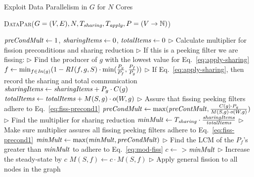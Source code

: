 \begin{algorithm}[t]
\caption{Exploit Data Parallelism in $G$ for $N$
  Cores} \label {alg:data-parallelize}
\footnotesize
\textsc{DataPar}($G=(V, E), N, T_{\relax{\it sharing}},
T_{\relax{\it apply}}, P=(V \rightarrow \mathbb{N}) $)
\begin{algorithmic}[1]
\State $\relax{\it preCondMult} \gets 1$, $\relax{\it sharingItems} \gets 0$, $\relax{\it totalItems} \gets 0$
\State $\triangleright$ Calculate multiplier for fission preconditions and sharing reduction
\State $\triangleright$ If this is a peeking filter we are fissing:
\State $\triangleright$ Find the producer of $g$ with the lowest
value for Eq.~\ref{eq:apply-sharing}
\State $f \gets \min_{f \in \relax{\it In}(g)} (1 -\relax{\it RI}(f,g, S) \cdot
\min(\frac{P_g}{P_f},\frac{P_f}{P_g} )) $
\label{ln:dp1}
\State $\triangleright$ If Eq.~\ref{eq:apply-sharing},
then record the sharing and total communication
\State $\relax{\it sharingItems} \gets \relax{\it sharingItems} + P_g \cdot C(g)$
\State $\relax{\it totalItems} \gets \relax{\it totalItems} + M(S,g) \cdot o(W, g)$
\EndIf 
\State $\triangleright$ Assure that fissing peeking filters adhere to Eq.~\ref{eq:fiss-precond1}
\State $\relax{\it preCondMult} \gets \max(\relax{\it preContMult}, \frac{C(g) \cdot P_g}{M(S,g)
 \cdot o(W,g)})$  
\label{ln:dp3}
\EndIf
\EndFor
\State $\triangleright$ Find the multiplier for sharing reduction
\State $\relax{\it minMult} \gets T_{\relax{\it sharing}} \cdot \frac{\relax{\it sharingItems}
}{\relax{\it totalItems}}$
\label{ln:dp2}
\State $\triangleright$ Make sure multiplier assures all fissing peeking filters
adhere to  Eq.~\ref{eq:fiss-precond1}
\State $\relax{\it minMult} \gets \max(\relax{\it minMult}, \relax{\it preCondMult})$
\State $\triangleright$ Find the LCM of the $P_f$'s
greater than $\relax{\it minMult}$ to adhere to Eq.~\ref{eq:mod-fiss}
\State $c \gets $ $ >
\relax{\it minMult}$
\label{ln:dp4}
\State $\triangleright$ Increase the steady-state by $c$
\State $M(S,f) \gets c \cdot M(S, f)$
\EndFor
\State $\triangleright$ Apply general fission to all nodes in the graph
\State {}
\EndFor
\end{algorithmic}
\end{algorithm}

